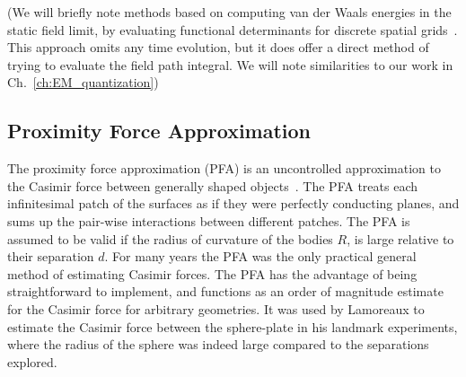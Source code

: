 (We will briefly note methods based on computing van der Waals energies in the static field limit,
by evaluating functional determinants for discrete spatial grids~\cite{Maggs2006,Pasquali2008}. This approach 
omits any time evolution, but it does offer a direct method of trying to evaluate the field path integral.
We will note similarities to our work in Ch.~\ref{ch:EM_quantization})




\subsection{Proximity Force Approximation}

The proximity force approximation (PFA) is an uncontrolled approximation to
the Casimir force between generally shaped objects~\cite{Derjaguin1956}.  
The PFA treats each infinitesimal patch of the surfaces as if they were perfectly conducting planes,
and sums up the pair-wise interactions between different patches.
The PFA is assumed to be valid if the radius of curvature of the bodies $R$, is large relative to 
their separation $d$.  
For many years the PFA was the only practical general method of estimating Casimir forces.
The PFA has the advantage of being straightforward to implement, and functions as an order of magnitude
estimate for the Casimir force for arbitrary geometries.
It was used by Lamoreaux to estimate the Casimir force between the sphere-plate
in his landmark experiments, where the radius of the sphere was indeed large compared to the separations explored. 


